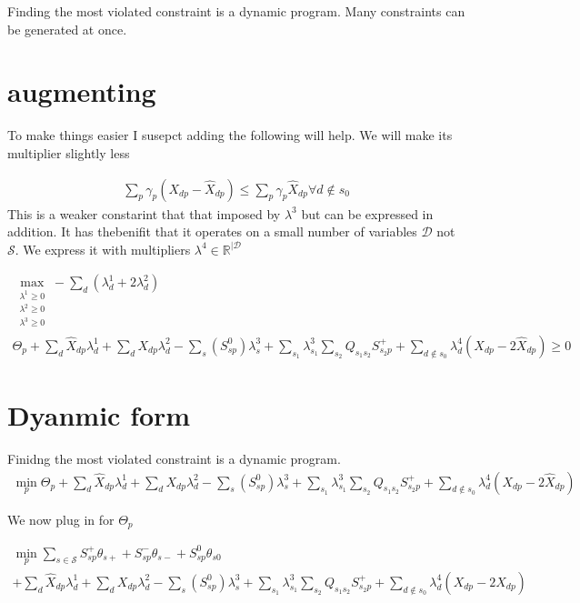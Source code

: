 \documentclass{article}
\begin{document}
 Finding the most violated constraint is a dynamic program.  Many constraints can be generated at once.  
 
 
 \section{augmenting}
 
 To make things easier I susepct adding the following will help.  We will make its multiplier slightly less
 
 \begin{align}
 \sum_{p}\gamma_p(X_{dp}-\hat{X}_{dp})\leq  \sum_{p}\gamma_p \hat{X}_{dp} \forall d \notin s_0
 \end{align}
 This is a weaker constarint that that imposed by  $\lambda^3$ but can be expressed in addition.   It has thebenifit that it operates on a small number of variables $\mathcal{D}$ not $\mathcal{S}$.  We express it with multipliers  $\lambda^4 \in \mathbb{R}^{|\mathcal{D}}$
 
 
 \begin{align}
 \max_{\substack{\lambda^1 \geq 0\\ \lambda^2 \geq 0 \\ \lambda^3 \geq 0 }}-\sum_d(\lambda^1_d+2\lambda^2_d) \\
 \Theta_p +\sum_d \hat{X}_{dp}\lambda^1_d+\sum_d X_{dp}\lambda^2_d -\sum_{s}(S^0_{sp})\lambda^3_s+ \sum_{s_1} \lambda^3_{s_1}\sum_{s_2}Q_{s_1s_2}S^+_{s_2p}+\sum_{d \notin s_0} \lambda^4_d(X_{dp}-2\hat{X}_{dp})\geq 0
 \end{align}
 \section{Dyanmic form}
Finidng the most violated constraint is a dynamic program.
\begin{align}
 \min_p \Theta_p +\sum_d \hat{X}_{dp}\lambda^1_d+\sum_d X_{dp}\lambda^2_d -\sum_{s}(S^0_{sp})\lambda^3_s+ \sum_{s_1} \lambda^3_{s_1}\sum_{s_2}Q_{s_1s_2}S^+_{s_2p}+\sum_{d \notin s_0} \lambda^4_d(X_{dp}-2\hat{X}_{dp})
 \end{align}
 
 We now plug in for $\Theta_p$
 
 \begin{align}
 \min_p \sum_{s \in \mathcal{S}}S^+_{sp}\theta_{s+}+S^-_{sp}\theta_{s-}+S^0_{sp}\theta_{s0} \\
 \nonumber +\sum_d \hat{X}_{dp}\lambda^1_d+\sum_d X_{dp}\lambda^2_d -\sum_{s}(S^0_{sp})\lambda^3_s+ \sum_{s_1} \lambda^3_{s_1}\sum_{s_2}Q_{s_1s_2}S^+_{s_2p}+\sum_{d \notin s_0} \lambda^4_d(X_{dp}-2\hat{X}_{dp})
 \end{align}
\end{document}
